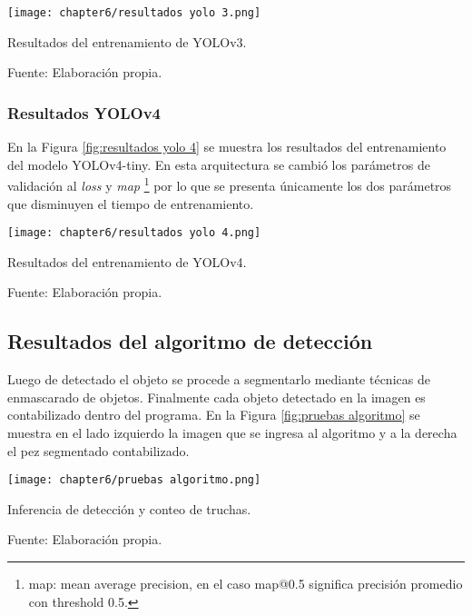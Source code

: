 \begin{myfigure}[H]
	\footnotesize\centering
	\texttt{[image: chapter6/resultados yolo 3.png]}
	\caption{Resultados del entrenamiento de YOLOv3.}
	\begin{myflushcenter}
		Fuente: Elaboración propia.
	\end{myflushcenter}
	\label{fig:resultados yolo 3}
\end{myfigure}

\subsubsection{Resultados YOLOv4}

En la Figura \ref{fig:resultados yolo 4} se muestra los resultados del entrenamiento del modelo YOLOv4-tiny. En esta arquitectura se cambió los parámetros de validación al \textit{loss} y \textit{map} \footnote{map: mean average precision, en el caso map@0.5 significa precisión promedio con threshold 0.5.} por lo que se presenta únicamente los dos parámetros que disminuyen el tiempo de entrenamiento.

\begin{myfigure}[H]
	\footnotesize\centering
	\texttt{[image: chapter6/resultados yolo 4.png]}
	\caption{Resultados del entrenamiento de YOLOv4.}
	\begin{myflushcenter}
		Fuente: Elaboración propia.
	\end{myflushcenter}
	\label{fig:resultados yolo 4}
\end{myfigure}


\subsection{Resultados del algoritmo de detección}

Luego de detectado el objeto se procede a segmentarlo mediante técnicas de enmascarado de objetos. Finalmente cada objeto detectado en la imagen es contabilizado dentro del programa. En la Figura \ref{fig:pruebas algoritmo} se muestra en el lado izquierdo la imagen que se ingresa al algoritmo y a la derecha el pez segmentado contabilizado.

\begin{myfigure}[H]
	\footnotesize\centering
	\texttt{[image: chapter6/pruebas algoritmo.png]}
	\caption{Inferencia de detección y conteo de truchas.}
	\begin{myflushcenter}
		Fuente: Elaboración propia.
	\end{myflushcenter}
	\label{fig:pruebas algoritmo}
\end{myfigure}

